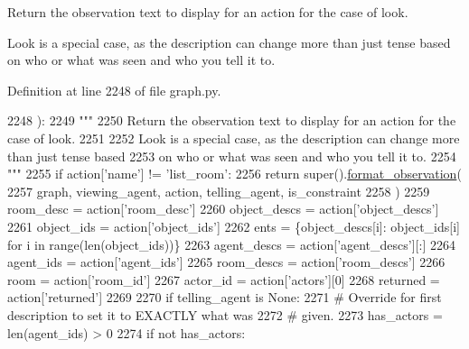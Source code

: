 \begin{DoxyVerb}Return the observation text to display for an action for the case of look.

Look is a special case, as the description can change more than just tense based
on who or what was seen and who you tell it to.
\end{DoxyVerb}
 

Definition at line 2248 of file graph.\+py.


\begin{DoxyCode}
2248     ):
2249         \textcolor{stringliteral}{"""}
2250 \textcolor{stringliteral}{        Return the observation text to display for an action for the case of look.}
2251 \textcolor{stringliteral}{}
2252 \textcolor{stringliteral}{        Look is a special case, as the description can change more than just tense based}
2253 \textcolor{stringliteral}{        on who or what was seen and who you tell it to.}
2254 \textcolor{stringliteral}{        """}
2255         \textcolor{keywordflow}{if} action[\textcolor{stringliteral}{'name'}] != \textcolor{stringliteral}{'list\_room'}:
2256             \textcolor{keywordflow}{return} super().\hyperlink{namespacelight__chats_1_1graph_a6d359942394976812f0055affc289f56}{format\_observation}(
2257                 graph, viewing\_agent, action, telling\_agent, is\_constraint
2258             )
2259         room\_desc = action[\textcolor{stringliteral}{'room\_desc'}]
2260         object\_descs = action[\textcolor{stringliteral}{'object\_descs'}]
2261         object\_ids = action[\textcolor{stringliteral}{'object\_ids'}]
2262         ents = \{object\_descs[i]: object\_ids[i] \textcolor{keywordflow}{for} i \textcolor{keywordflow}{in} range(len(object\_ids))\}
2263         agent\_descs = action[\textcolor{stringliteral}{'agent\_descs'}][:]
2264         agent\_ids = action[\textcolor{stringliteral}{'agent\_ids'}]
2265         room\_descs = action[\textcolor{stringliteral}{'room\_descs'}]
2266         room = action[\textcolor{stringliteral}{'room\_id'}]
2267         actor\_id = action[\textcolor{stringliteral}{'actors'}][0]
2268         returned = action[\textcolor{stringliteral}{'returned'}]
2269 
2270         \textcolor{keywordflow}{if} telling\_agent \textcolor{keywordflow}{is} \textcolor{keywordtype}{None}:
2271             \textcolor{comment}{# Override for first description to set it to EXACTLY what was}
2272             \textcolor{comment}{# given.}
2273             has\_actors = len(agent\_ids) > 0
2274             \textcolor{keywordflow}{if} \textcolor{keywordflow}{not} has\_actors:

\end{DoxyCode}
